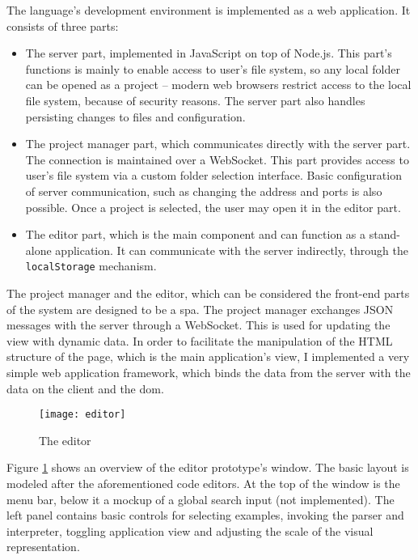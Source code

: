 The language's development environment is implemented as a web application. It
consists of three parts:
\begin{itemize}
    \item The server part, implemented in JavaScript on top of Node.js. This
      part's functions is mainly to enable access to user's file system, so any
      local folder can be opened as a project -- modern web browsers restrict
      access to the local file system, because of security reasons. The server
      part also handles persisting changes to files and configuration.
    \item The project manager part, which communicates directly with the server
      part. The connection is maintained over a
      WebSocket\cite{mdn_websockets}. This
      part provides access to user's file system via a custom folder selection
      interface. Basic configuration of server communication, such as changing
      the address and ports is also possible. Once a project is selected, the
      user may open it in the editor part.
    \item The editor part, which is the main component and can function as a
      stand-alone application. It can communicate with the server indirectly,
      through the \texttt{localStorage}
      mechanism\cite{mdn_localstorage}.
\end{itemize}

The project manager and the editor, which can be considered the front-end parts
of the system are designed to be a
\acrlong{spa}\cite{spa_wikipedia}. The
project manager exchanges JSON messages with the server through a
WebSocket. This is used for updating the view with dynamic data. In order to
facilitate the manipulation of the HTML structure of the page, which is the main
application's view, I implemented a very simple web application framework, which
binds the data from the server with the data on the client and the
\acrlong{dom}\cite[Chapter~13]{eloquentjs}.

\begin{figure}[h!]
\centering \texttt{[image: editor]}
\caption{The editor}
\label{fig:editor}
\end{figure}

Figure \ref{fig:editor} shows an overview of the editor prototype's window. The
basic layout is modeled after the aforementioned code editors. At the top of the
window is the menu bar, below it a mockup of a global search input (not implemented). The left panel contains basic controls for selecting examples,
invoking the parser and interpreter, toggling application view and adjusting the
scale of the visual representation.

